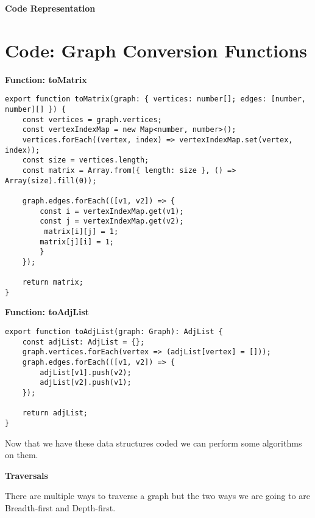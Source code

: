 \documentclass[12pt,letterpaper, onecolumn]{exam}
\begin{document}
\vspace{.3cm}
\centering
\newpage

\centering \textbf{Code Representation}
\vspace{.4cm}

\section*{Code: Graph Conversion Functions}

\begin{multicols}{2}

\textbf{Function: toMatrix}
\begin{lstlisting}
export function toMatrix(graph: { vertices: number[]; edges: [number, number][] }) {
    const vertices = graph.vertices;
    const vertexIndexMap = new Map<number, number>();
    vertices.forEach((vertex, index) => vertexIndexMap.set(vertex, index));
    const size = vertices.length;
    const matrix = Array.from({ length: size }, () => Array(size).fill(0));

    graph.edges.forEach(([v1, v2]) => {
        const i = vertexIndexMap.get(v1);
        const j = vertexIndexMap.get(v2);
         matrix[i][j] = 1;
        matrix[j][i] = 1; 
        }
    });

    return matrix;
}
\end{lstlisting}

\columnbreak

\textbf{Function: toAdjList}
\begin{lstlisting}
export function toAdjList(graph: Graph): AdjList {
    const adjList: AdjList = {};
    graph.vertices.forEach(vertex => (adjList[vertex] = []));
    graph.edges.forEach(([v1, v2]) => {
        adjList[v1].push(v2);
        adjList[v2].push(v1); 
    });

    return adjList;
}
\end{lstlisting}
\end{multicols}

\vspace{.2cm}

\centering Now that we have these data structures coded we can perform some algorithms on them.

\newpage

\centering \textbf{Traversals}

\vspace{.4cm}

\centering There are multiple ways to traverse a graph but the two ways we are going to are Breadth-first and Depth-first.  
\end{document}
